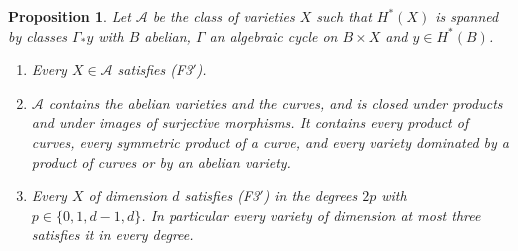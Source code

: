\documentclass[11pt,reqno]{amsart}
\numberwithin{equation}{section}
\theoremstyle{plain}
\newtheorem{proposition}[theorem]{Proposition}
\theoremstyle{definition}
\newcommand{\Fiii}{\texorpdfstring{\textup{(F3$'$)}}{(F3')}}
\begin{document}
\begin{proposition}\label{prop:f3prime-known}
Let $\mathcal{A}$ be the class of varieties $X$ such that $H^{*}(X)$ is spanned by classes $\Gamma_{*}y$ with $B$ abelian, $\Gamma$ an algebraic cycle on $B\times X$ and $y\in H^{*}(B)$.
\begin{enumerate}[label=\textup{(\roman*)},leftmargin=2.4em,itemsep=2pt]
\item Every $X\in\mathcal{A}$ satisfies \Fiii{}.
\item $\mathcal{A}$ contains the abelian varieties and the curves, and is closed under products and under images of surjective morphisms. It contains every product of curves, every symmetric product of a curve, and every variety dominated by a product of curves or by an abelian variety.
\item Every $X$ of dimension $d$ satisfies \Fiii{} in the degrees $2p$ with $p\in\{0,1,d-1,d\}$. In particular every variety of dimension at most three satisfies it in every degree.
\end{enumerate}
\end{proposition}
\end{document}
